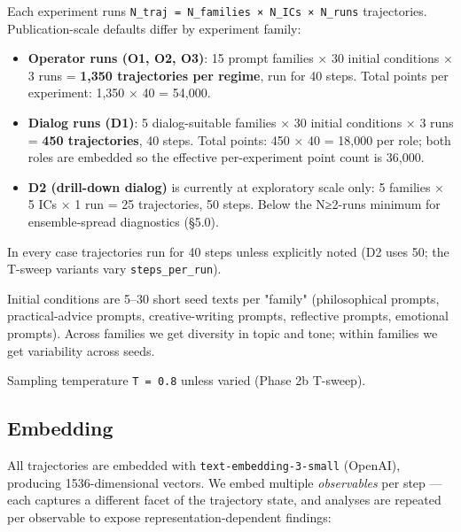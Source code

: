 \documentclass{article}
\theoremstyle{plain}
\theoremstyle{definition}
\begin{document}
Each experiment runs \texttt{N\_traj = N\_families × N\_ICs × N\_runs}
trajectories. Publication-scale defaults differ by experiment family:

\begin{itemize}
  \item \textbf{Operator runs (O1, O2, O3)}: 15 prompt families × 30 initial
  conditions × 3 runs = \textbf{1,350 trajectories per regime}, run for
  40 steps. Total points per experiment: 1,350 × 40 = 54,000.
  \item \textbf{Dialog runs (D1)}: 5 dialog-suitable families × 30 initial
  conditions × 3 runs = \textbf{450 trajectories}, 40 steps. Total points:
  450 × 40 = 18,000 per role; both roles are embedded so the
  effective per-experiment point count is 36,000.
  \item \textbf{D2 (drill-down dialog)} is currently at exploratory scale only:
  5 families × 5 ICs × 1 run = 25 trajectories, 50 steps. Below the
  N≥2-runs minimum for ensemble-spread diagnostics (§5.0).
\end{itemize}

In every case trajectories run for 40 steps unless explicitly noted
(D2 uses 50; the T-sweep variants vary \texttt{steps\_per\_run}).

Initial conditions are 5–30 short seed texts per "family" (philosophical
prompts, practical-advice prompts, creative-writing prompts, reflective
prompts, emotional prompts). Across families we get diversity in topic
and tone; within families we get variability across seeds.

Sampling temperature \texttt{T = 0.8} unless varied (Phase 2b T-sweep).

\subsection{Embedding}

All trajectories are embedded with \texttt{text-embedding-3-small} (OpenAI),
producing 1536-dimensional vectors. We embed multiple \textit{observables} per
step — each captures a different facet of the trajectory state, and
analyses are repeated per observable to expose representation-dependent
findings:
\end{document}
